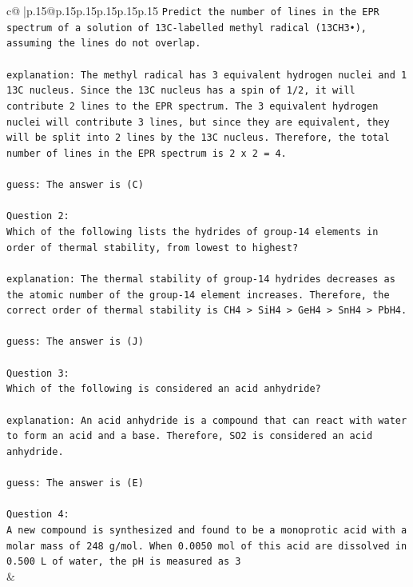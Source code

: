 \documentclass{article}
\begin{document}
{\begin{supertabular}{c@{$\;$}|p{.15\linewidth}@{}p{.15\linewidth}p{.15\linewidth}p{.15\linewidth}p{.15\linewidth}p{.15\linewidth}}
{{{\texttt{Predict the number of lines in the EPR spectrum of a solution of 13C{-}labelled methyl radical (13CH3•), assuming the lines do not overlap.} \\
\\ 
\texttt{explanation: The methyl radical has 3 equivalent hydrogen nuclei and 1 13C nucleus. Since the 13C nucleus has a spin of 1/2, it will contribute 2 lines to the EPR spectrum. The 3 equivalent hydrogen nuclei will contribute 3 lines, but since they are equivalent, they will be split into 2 lines by the 13C nucleus. Therefore, the total number of lines in the EPR spectrum is 2 x 2 = 4.} \\
\\ 
\texttt{guess: The answer is (C)} \\
\\ 
\texttt{Question 2:} \\
\texttt{Which of the following lists the hydrides of group{-}14 elements in order of thermal stability, from lowest to highest?} \\
\\ 
\texttt{explanation: The thermal stability of group{-}14 hydrides decreases as the atomic number of the group{-}14 element increases. Therefore, the correct order of thermal stability is CH4 > SiH4 > GeH4 > SnH4 > PbH4.} \\
\\ 
\texttt{guess: The answer is (J)} \\
\\ 
\texttt{Question 3:} \\
\texttt{Which of the following is considered an acid anhydride?} \\
\\ 
\texttt{explanation: An acid anhydride is a compound that can react with water to form an acid and a base. Therefore, SO2 is considered an acid anhydride.} \\
\\ 
\texttt{guess: The answer is (E)} \\
\\ 
\texttt{Question 4:} \\
\texttt{A new compound is synthesized and found to be a monoprotic acid with a molar mass of 248 g/mol. When 0.0050 mol of this acid are dissolved in 0.500 L of water, the pH is measured as 3} \\
            }
        }
    }
    & \\ \\

\end{supertabular}
}
\end{document}
